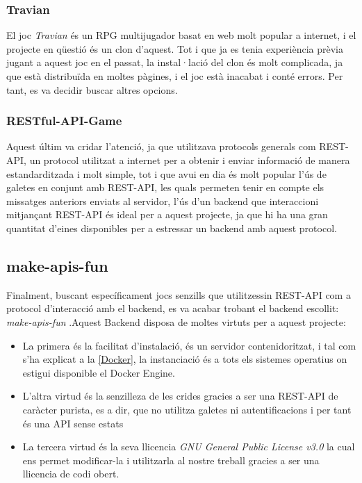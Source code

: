 \subsubsection{Travian}

El joc \textit{Travian} és un RPG multijugador basat en web molt popular a internet, i el projecte en qüestió és un clon d'aquest. Tot i que ja es tenia experiència prèvia jugant a aquest joc en el passat, la instal·lació del clon és molt complicada, ja que està distribuïda en moltes pàgines, i el joc està inacabat i conté errors. Per tant, es va decidir buscar altres opcions.\cite{mousset_pierre-alexandre35travian_2024}

\subsubsection{RESTful-API-Game}


Aquest últim va cridar l'atenció, ja que utilitzava protocols generals com REST-API, un protocol utilitzat a internet per a obtenir i enviar informació de manera estandarditzada i molt simple\cite{rodriguez_rest_2016}, tot i que avui en dia és molt popular l'ús de galetes en conjunt amb REST-API, les quals permeten tenir en compte els missatges anteriors enviats al servidor, l'ús d'un backend que interaccioni mitjançant REST-API és ideal per a aquest projecte, ja que hi ha una gran quantitat d'eines disponibles per a estressar un backend amb aquest protocol\cite{li_design_2011}.

\subsection{make-apis-fun}

Finalment, buscant específicament jocs senzills que utilitzessin REST-API com a protocol d'interacció amb el backend, es va acabar trobant el backend escollit: \textit{make-apis-fun} \cite{noauthor_make-apis-funmake-apis-fun_2024}.Aquest Backend disposa de moltes virtuts per a aquest projecte:

\begin{itemize}
    \item  La primera és la facilitat d'instalació, és un servidor contenidoritzat, i tal com s'ha explicat a la \autoref{Docker}, la instanciació és a tots els sistemes operatius on estigui disponible el Docker Engine.
    \item L'altra virtud és la senzilleza de les crides gracies a ser una REST-API de caràcter purista, es a dir, que no utilitza galetes ni autentificacions i per tant és una API sense estats
    \item La tercera virtud és la seva llicencia \textit{GNU General Public License v3.0} la cual ens permet modificar-la i utilitzarla al nostre treball gracies a ser una llicencia de codi obert.
\end{itemize}

